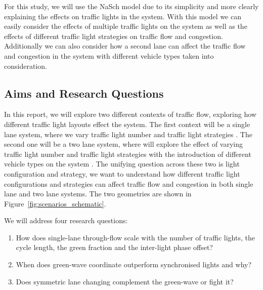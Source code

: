For this study, we will use the NaSch model due to its simplicity and more clearly explaining the effects on traffic lights in the system. With this model we can easily consider the effects of multiple traffic lights on the system as well as the effects of different traffic light strategies on traffic flow and congestion. Additionally we can also consider how a second lane can affect the traffic flow and congestion in the system with different vehicle types taken into consideration.


\subsection{Aims and Research Questions}

In this report, we will explore two different contexts of traffic flow, exploring how different traffic light layouts effect the system. 
The first context will be a single lane system, where we vary traffic light number and traffic light strategies \cite{nagelCellularAutomatonModel1992}.
The second one will be a two lane system, where will explore the effect of varying traffic light number and traffic light strategies with the introduction of different vehicle types on the system \cite{rickertTwoLaneTraffic1996,chowdhuryParticleHoppingModels1997}. 
The unifying question across these two is light configuration and strategy, we want to understand how different traffic light configurations and strategies can affect traffic flow and congestion in both single lane and two lane systems. The two geometries are shown in Figure~\ref{fig:scenarios_schematic}.

We will address four research questions:
\begin{enumerate}
    \item How does single-lane through-flow scale with the number of traffic lights, the cycle length, the green fraction and the inter-light phase offset?
    \item When does green-wave coordinate outperform synchronised lights and why?
    \item Does symmetric lane changing complement the green-wave or fight it?
\end{enumerate}




